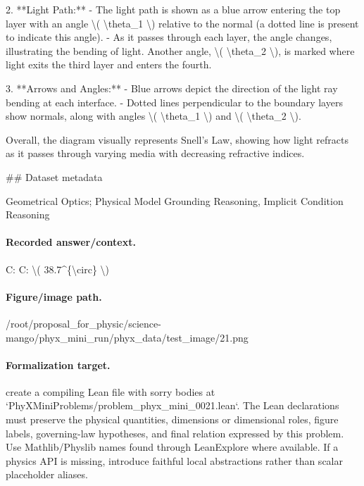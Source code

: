 2. **Light Path:**
   - The light path is shown as a blue arrow entering the top layer with an angle \textbackslash{}( \textbackslash{}theta\_1 \textbackslash{}) relative to the normal (a dotted line is present to indicate this angle).
   - As it passes through each layer, the angle changes, illustrating the bending of light. Another angle, \textbackslash{}( \textbackslash{}theta\_2 \textbackslash{}), is marked where light exits the third layer and enters the fourth.

3. **Arrows and Angles:**
   - Blue arrows depict the direction of the light ray bending at each interface.
   - Dotted lines perpendicular to the boundary layers show normals, along with angles \textbackslash{}( \textbackslash{}theta\_1 \textbackslash{}) and \textbackslash{}( \textbackslash{}theta\_2 \textbackslash{}).

Overall, the diagram visually represents Snell's Law, showing how light refracts as it passes through varying media with decreasing refractive indices.

\#\# Dataset metadata

Geometrical Optics; Physical Model Grounding Reasoning, Implicit Condition Reasoning

\paragraph{Recorded answer/context.}
C: C: \textbackslash{}( 38.7\textasciicircum{}\{\textbackslash{}circ\} \textbackslash{})

\paragraph{Figure/image path.}
/root/proposal\_for\_physic/science-mango/phyx\_mini\_run/phyx\_data/test\_image/21.png

\paragraph{Formalization target.}
create a compiling Lean file with sorry bodies at `PhyXMiniProblems/problem\_phyx\_mini\_0021.lean`. The Lean declarations must preserve the physical quantities, dimensions or dimensional roles, figure labels, governing-law hypotheses, and final relation expressed by this problem.
Use Mathlib/Physlib names found through LeanExplore where available. If a physics API is missing, introduce faithful local abstractions rather than scalar placeholder aliases.

